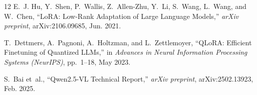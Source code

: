 \documentclass[a4paper,10pt,twoside]{article}
\begin{document}
\begin{thebibliography}{12}
E.~J. Hu, Y.~Shen, P.~Wallis, Z.~Allen-Zhu, Y.~Li, S.~Wang, L.~Wang, and W.~Chen, ``LoRA: Low-Rank Adaptation of Large Language Models,'' \textit{arXiv preprint}, arXiv:2106.09685, Jun. 2021.

T.~Dettmers, A.~Pagnoni, A.~Holtzman, and L.~Zettlemoyer, ``QLoRA: Efficient Finetuning of Quantized LLMs,'' in \textit{Advances in Neural Information Processing Systems (NeurIPS)}, pp.~1--18, May 2023.

S.~Bai et~al., ``Qwen2.5-VL Technical Report,'' \textit{arXiv preprint}, arXiv:2502.13923, Feb. 2025.

\end{thebibliography}
\end{document}
